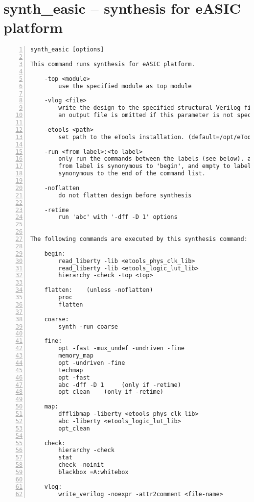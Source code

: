 \section{synth\_easic -- synthesis for eASIC platform}
\label{cmd:synth_easic}
\begin{lstlisting}[numbers=left,frame=single]
    synth_easic [options]

This command runs synthesis for eASIC platform.

    -top <module>
        use the specified module as top module

    -vlog <file>
        write the design to the specified structural Verilog file. writing of
        an output file is omitted if this parameter is not specified.

    -etools <path>
        set path to the eTools installation. (default=/opt/eTools)

    -run <from_label>:<to_label>
        only run the commands between the labels (see below). an empty
        from label is synonymous to 'begin', and empty to label is
        synonymous to the end of the command list.

    -noflatten
        do not flatten design before synthesis

    -retime
        run 'abc' with '-dff -D 1' options


The following commands are executed by this synthesis command:

    begin:
        read_liberty -lib <etools_phys_clk_lib>
        read_liberty -lib <etools_logic_lut_lib>
        hierarchy -check -top <top>

    flatten:    (unless -noflatten)
        proc
        flatten

    coarse:
        synth -run coarse

    fine:
        opt -fast -mux_undef -undriven -fine
        memory_map
        opt -undriven -fine
        techmap
        opt -fast
        abc -dff -D 1     (only if -retime)
        opt_clean    (only if -retime)

    map:
        dfflibmap -liberty <etools_phys_clk_lib>
        abc -liberty <etools_logic_lut_lib>
        opt_clean

    check:
        hierarchy -check
        stat
        check -noinit
        blackbox =A:whitebox

    vlog:
        write_verilog -noexpr -attr2comment <file-name>
\end{lstlisting}

